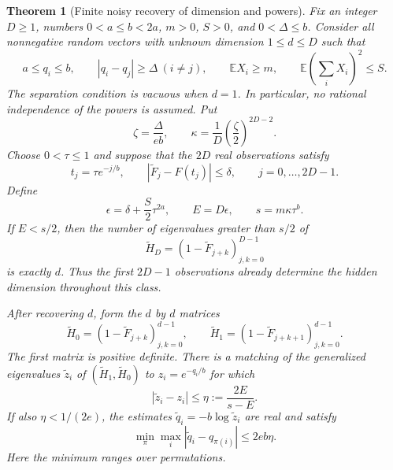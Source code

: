 \documentclass[11pt,letterpaper]{article}
\newtheorem{theorem}{Theorem}[section]
\theoremstyle{definition}
\theoremstyle{remark}
\newcommand{\1}{\mathbf 1}
\begin{document}
\begin{theorem}[Finite noisy recovery of dimension and powers]
\label{p08:thm:finite-blind}
Fix an integer $D\geq1$, numbers $0<a\leq b<2a$, $m>0$, $S>0$,
and $0<\Delta\leq b$.  Consider all nonnegative random vectors with
unknown dimension $1\leq d\leq D$ such that
\begin{equation}\label{p08:eq:finite-blind-class}
 a\leq q_i\leq b,\qquad |q_i-q_j|\geq\Delta\ (i\ne j),\qquad
 \mathbb E X_i\geq m,\qquad
 \mathbb E\left(\sum_iX_i\right)^2\leq S.
\end{equation}
The separation condition is vacuous when $d=1$.  In particular, no
rational independence of the powers is assumed.  Put
\begin{equation}\label{p08:eq:finite-blind-constants}
 \zeta=\frac{\Delta}{eb},\qquad
 \kappa=\frac1D\left(\frac{\zeta}{2}\right)^{2D-2}.
\end{equation}
Choose $0<\tau\leq1$ and suppose that the $2D$ real observations satisfy
\[
 t_j=\tau e^{-j/b},\qquad
 |\widetilde F_j-F(t_j)|\leq\delta,
 \qquad j=0,\ldots,2D-1.
\]
Define
\begin{equation}\label{p08:eq:finite-blind-error}
 \epsilon=\delta+\frac S2\tau^{2a},\qquad
 E=D\epsilon,\qquad s=m\kappa\tau^b.
\end{equation}
If $E<s/2$, then the number of eigenvalues greater than $s/2$ of
\[
 \widetilde H_D=(1-\widetilde F_{j+k})_{j,k=0}^{D-1}
\]
is exactly $d$.  Thus the first $2D-1$ observations already determine
the hidden dimension throughout this class.

After recovering $d$, form the $d$ by $d$ matrices
\[
 \widetilde H_0=(1-\widetilde F_{j+k})_{j,k=0}^{d-1},\qquad
 \widetilde H_1=(1-\widetilde F_{j+k+1})_{j,k=0}^{d-1}.
\]
The first matrix is positive definite.  There is a matching of the
generalized eigenvalues $\widetilde z_i$ of
$(\widetilde H_1,\widetilde H_0)$ to $z_i=e^{-q_i/b}$ for which
\begin{equation}\label{p08:eq:finite-blind-node-error}
 |\widetilde z_i-z_i|\leq
 \eta:=\frac{2E}{s-E}.
\end{equation}
If also $\eta<1/(2e)$, the estimates
$\widetilde q_i=-b\log\widetilde z_i$ are real and satisfy
\begin{equation}\label{p08:eq:finite-blind-power-error}
 \min_{\pi}\max_i|\widetilde q_i-q_{\pi(i)}|
 \leq 2eb\eta.
\end{equation}
Here the minimum ranges over permutations.
\end{theorem}
\end{document}
